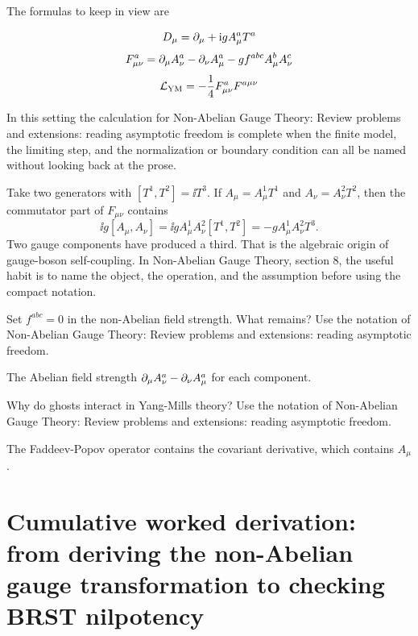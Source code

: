The formulas to keep in view are

\[
  D_\mu=\partial_\mu+\mathrm i gA_\mu^aT^a
\]
\[
  F_{\mu\nu}^a=\partial_\mu A_\nu^a-\partial_\nu A_\mu^a-gf^{abc}A_\mu^bA_\nu^c
\]
\[
  \mathcal L_{\mathrm{YM}}=-\frac14F_{\mu\nu}^aF^{a\mu\nu}
\]

In this setting the calculation for Non-Abelian Gauge Theory: Review problems and extensions: reading asymptotic freedom is complete when the finite model, the limiting step, and the normalization or boundary condition can all be named without looking back at the prose.




\begin{example}
Take two generators with \([T^1,T^2]=\ii T^3\).  If \(A_\mu=A_\mu^1T^1\) and \(A_\nu=A_\nu^2T^2\), then the commutator part of \(F_{\mu\nu}\) contains
\[
  \ii g[A_\mu,A_\nu]=\ii gA_\mu^1A_\nu^2[T^1,T^2]=-gA_\mu^1A_\nu^2T^3.
\]
Two gauge components have produced a third.  That is the algebraic origin of gauge-boson self-coupling.  In Non-Abelian Gauge Theory, section 8, the useful habit is to name the object, the operation, and the assumption before using the compact notation.
\end{example}



\begin{exercise}
Set \(f^{abc}=0\) in the non-Abelian field strength.  What remains?  Use the notation of Non-Abelian Gauge Theory: Review problems and extensions: reading asymptotic freedom.
\begin{answer}
The Abelian field strength \(\partial_\mu A_\nu^a-\partial_\nu A_\mu^a\) for each component.
\end{answer}
\end{exercise}

\begin{exercise}
Why do ghosts interact in Yang-Mills theory?  Use the notation of Non-Abelian Gauge Theory: Review problems and extensions: reading asymptotic freedom.
\begin{answer}
The Faddeev-Popov operator contains the covariant derivative, which contains \(A_\mu\).
\end{answer}
\end{exercise}



\section{Cumulative worked derivation: from deriving the non-Abelian gauge transformation to checking BRST nilpotency}

